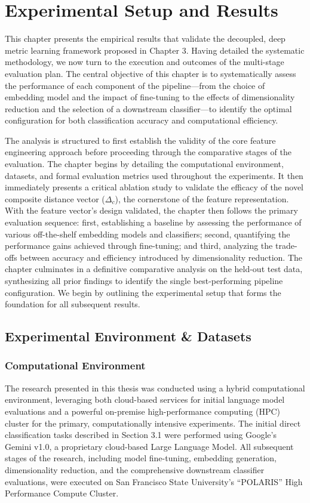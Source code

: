 \chapter{Experimental Setup and Results}\label{ch:4}
This chapter presents the empirical results that validate the decoupled, deep metric learning framework proposed in Chapter 3. Having detailed the systematic methodology, we now turn to the execution and outcomes of the multi-stage evaluation plan. The central objective of this chapter is to systematically assess the performance of each component of the pipeline---from the choice of embedding model and the impact of fine-tuning to the effects of dimensionality reduction and the selection of a downstream classifier---to identify the optimal configuration for both classification accuracy and computational efficiency.

The analysis is structured to first establish the validity of the core feature engineering approach before proceeding through the comparative stages of the evaluation. The chapter begins by detailing the computational environment, datasets, and formal evaluation metrics used throughout the experiments. It then immediately presents a critical ablation study to validate the efficacy of the novel composite distance vector (\(\Delta_c\)), the cornerstone of the feature representation. With the feature vector's design validated, the chapter then follows the primary evaluation sequence: first, establishing a baseline by assessing the performance of various off-the-shelf embedding models and classifiers; second, quantifying the performance gains achieved through fine-tuning; and third, analyzing the trade-offs between accuracy and efficiency introduced by dimensionality reduction. The chapter culminates in a definitive comparative analysis on the held-out test data, synthesizing all prior findings to identify the single best-performing pipeline configuration. We begin by outlining the experimental setup that forms the foundation for all subsequent results.

\section{Experimental Environment \& Datasets}
\subsection{Computational Environment}
The research presented in this thesis was conducted using a hybrid computational environment, leveraging both cloud-based services for initial language model evaluations and a powerful on-premise high-performance computing (HPC) cluster for the primary, computationally intensive experiments. The initial direct classification tasks described in Section 3.1 were performed using Google's Gemini v1.0, a proprietary cloud-based Large Language Model. All subsequent stages of the research, including model fine-tuning, embedding generation, dimensionality reduction, and the comprehensive downstream classifier evaluations, were executed on San Francisco State University's ``POLARIS'' High Performance Compute Cluster.

